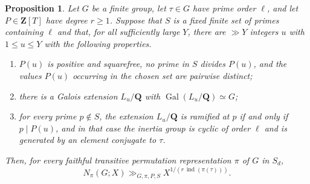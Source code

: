 \documentclass[11pt,hidelinks]{amsart}
\newtheorem{proposition}[theorem]{Proposition}
\newcommand{\Q}{\mathbf Q}
\newcommand{\Z}{\mathbf Z}
\newcommand{\Gal}{\operatorname{Gal}}
\newcommand{\ind}{\operatorname{ind}}
\begin{document}
\begin{proposition}\label{prop:counting-principle}
Let $G$ be a finite group, let $\tau\in G$ have prime order $\ell$, and let $P\in\Z[T]$ have degree $r\geq1$. Suppose that $S$ is a fixed finite set of primes containing $\ell$ and that, for all sufficiently large $Y$, there are $\gg Y$ integers $u$ with $1\leq u\leq Y$ with the following properties.
\begin{enumerate}[label=\textup{(\roman*)}]
\item $P(u)$ is positive and squarefree, no prime in $S$ divides $P(u)$, and the values $P(u)$ occurring in the chosen set are pairwise distinct;
\item there is a Galois extension $L_u/\Q$ with $\Gal(L_u/\Q)\simeq G$;
\item for every prime $p\notin S$, the extension $L_u/\Q$ is ramified at $p$ if and only if $p\mid P(u)$, and in that case the inertia group is cyclic of order $\ell$ and is generated by an element conjugate to $\tau$.
\end{enumerate}
Then, for every faithful transitive permutation representation $\pi$ of $G$ in $S_d$,
\[
 N_\pi(G;X)\gg_{G,\pi,P,S}X^{1/(r\,\ind(\pi(\tau)))}.
\]
\end{proposition}
\end{document}
